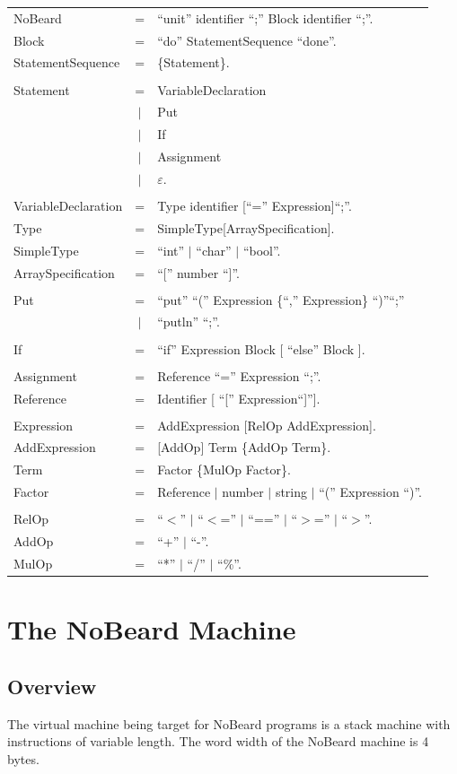 \documentclass[11pt]{report}
\newcommand{\leongage}{NoBeard}
\newcommand{\emptystring}{$\varepsilon$}
\newenvironment{grammar}
	{	\begin{tabular}{p{.25\textwidth} c p{.75\textwidth}}
	}
	{	\end{tabular}
	}
\newcommand{\completerule}[2]{#1 & = & #2.\\}
\newcommand{\startrule}[2]{#1 & = & #2\\}
\newcommand{\alternativerule}[1]{ & $|$ & #1\\}
\newcommand{\alternativeend}[1]{ & $|$ & #1.\\}
\begin{document}
	\begin{grammar}
		\completerule{NoBeard}{``unit'' identifier ``;'' Block identifier ``;''}

		\completerule{Block}{``do'' StatementSequence ``done''}

		\completerule{StatementSequence}{\{Statement\}}
		\\

		\startrule{Statement}{VariableDeclaration}
		\alternativerule{Put}
		\alternativerule{If}
		\alternativerule{Assignment}
		\alternativeend{\emptystring}
		\\
		\completerule{VariableDeclaration}{Type identifier [``='' Expression]``;''}
		\completerule{Type}{SimpleType[ArraySpecification]}
		\completerule{SimpleType}{``int'' $|$ ``char'' $|$ ``bool''}
		\completerule{ArraySpecification}{``['' number ``]''}
		\\
		\startrule{Put}{``put'' ``('' Expression \{``,'' Expression\} ``)''``;''}
		\alternativeend{``putln'' ``;''}
		\\
		\completerule{If}{``if'' Expression Block [ ``else'' Block ]}
		\\
		\completerule{Assignment}{Reference ``='' Expression ``;''}
		\completerule{Reference}{Identifier [ ``['' Expression``]'']}
		\\
		\completerule{Expression}{AddExpression [RelOp AddExpression]}
		\completerule{AddExpression}{[AddOp] Term \{AddOp Term\}}
		\completerule{Term}{Factor \{MulOp Factor\}}
		\completerule{Factor}{Reference $|$ number $|$ string $|$ ``('' Expression ``)''}
		\\
		\completerule{RelOp}{``$<$'' $|$ ``$<$='' $|$ ``=='' $|$ ``$>$='' $|$ ``$>$''}
		\completerule{AddOp}{``+'' $|$ ``-''}
		\completerule{MulOp}{``*'' $|$ ``/'' $|$ ``\%''}	
	\end{grammar}

\chapter{The \leongage{} Machine}
\section{Overview}
The virtual machine being target for \leongage{} programs is a stack machine with instructions of variable length. The word
width of the \leongage{} machine is 4 bytes.
\end{document}
